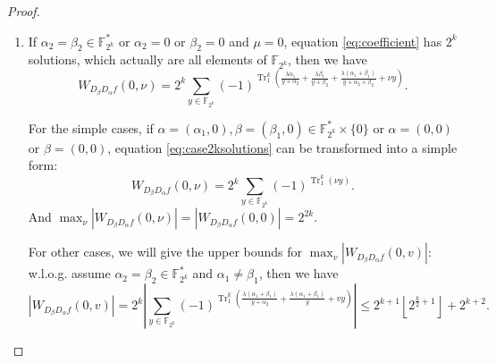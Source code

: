 \documentclass{article}
\newcommand{\F}{\mathbb{F}}
\newcommand{\0}{\textbf{0}}
\newcommand{\1}{\textbf{1}}
\newcommand{\TRACE}{\operatorname{Tr}_1^k}
\theoremstyle{plain}
\begin{document}
\begin{proof}
    \begin{enumerate}[label=\textbf{Case \arabic*},wide = 0pt]
        \item If $ \alpha_2=\beta_2\in\F_{2^k}^* $ or $ \alpha_2=0 $ or $ \beta_2=0 $ 
    and $ \mu=0 $, equation \eqref{eq:coefficient} has $ 2^k $ solutions, 
    which actually are all elements of $ \F_{2^k} $, 
    then we have 
    \begin{equation}\label{eq:case2ksolutions}
        W_{D_{\beta}D_{\alpha}f}(0,\nu)=2^k\sum_{y\in\F_{2^k}}(-1)^{\TRACE\left(\frac{\lambda\alpha_1}{y+\alpha_2}+\frac{\lambda\beta_1}{y+\beta_2}+\frac{\lambda(\alpha_1+\beta_1)}{y+\alpha_2+\beta_2}+\nu y\right)}.
    \end{equation}



    
    For the simple cases, if $ \alpha=(\alpha_1,0),\beta=(\beta_1,0)\in\F_{2^k}^*\times\{0\} $ 
    or $ \alpha=(0,0) $ or $ \beta=(0,0) $, equation \eqref{eq:case2ksolutions} can be transformed into a simple form:
    \[W_{D_{\beta}D_{\alpha}f}(0,\nu)=2^k\sum_{y\in\F_{2^k}}(-1)^{\TRACE\left(\nu y\right)}.\]
    And $ \max_{\nu}|W_{D_{\beta}D_{\alpha}f}(0,\nu)|=|W_{D_{\beta}D_{\alpha}f}(0,0)|=2^{2k} $.

    For other cases, we will give the upper bounds for $ \max_{v}|W_{D_{\beta}D_{\alpha}f}(0,v)| $: 
    w.l.o.g. assume $ \alpha_2=\beta_2\in\F_{2^k}^* $ and $ \alpha_1\ne\beta_1 $, then we have 
    \[\left\lvert W_{D_{\beta}D_{\alpha}f}(0,v)\right\rvert =2^k\left\lvert \sum_{y\in\F_{2^k}}(-1)^{\TRACE\left(\frac{\lambda(\alpha_1+\beta_1)}{y+\alpha_2}+\frac{\lambda(\alpha_1+\beta_1)}{y}+vy\right)}\right\rvert\le 2^{k+1}\left\lfloor 2^{\frac{k}{2}+1}\right\rfloor+2^{k+2}.\]


\end{enumerate}
\end{proof}
\end{document}
